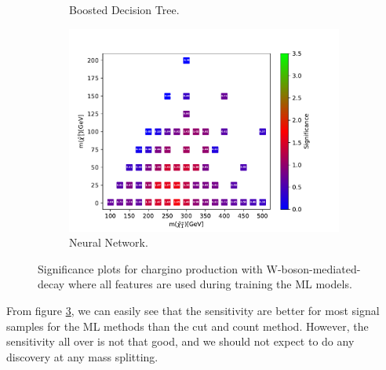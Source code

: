 \begin{figure}[H]
\begin{subfigure}[t!]{0.49\textwidth}
    \caption{Boosted Decision Tree.}
        \label{fig:signAllWWBDT}
    \end{subfigure}      
    \begin{subfigure}[t!]{0.49\textwidth}
    \includegraphics[width = \textwidth]{Figures/Significances/significance_NN_WW_All_level.pdf}
    \caption{Neural Network.}
        \label{fig:signAllWWNN}
    \end{subfigure}
    \caption{Significance plots for chargino production with W-boson-mediated-decay where all features are used during training the ML models.}
    \label{fig:signAllWW}
\end{figure}

From figure \ref{fig:signAllWW}, we can easily see that the sensitivity are better for most signal samples for the ML methods than the cut and count method. However, the sensitivity all over is not that good, and we should not expect to do any discovery at any mass splitting. 


































